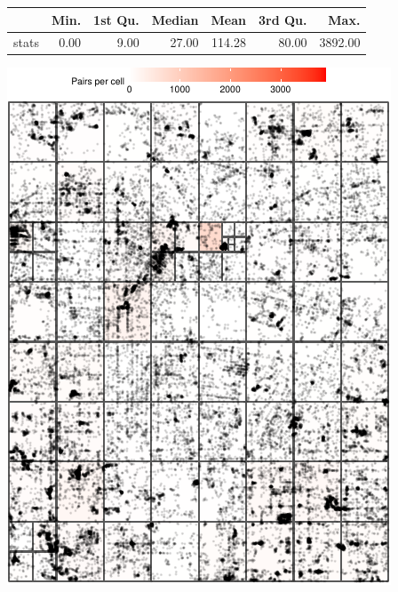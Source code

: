\documentclass[
  9pt,
  landscape]{article}
\begin{document}
\begin{minipage}{0.5\textwidth} 
\centering 
\begin{tabular}{rrrrrrr}
  \hline
 & Min. & 1st Qu. & Median & Mean & 3rd Qu. & Max. \\ 
  \hline
stats & 0.00 & 9.00 & 27.00 & 114.28 & 80.00 & 3892.00 \\ 
   \hline
\end{tabular}
\vspace{0.5cm} 


\includegraphics[width=1\linewidth,height=0.8\textheight]{distance_files/figure-latex/p2_318_1500_4-1} 

\end{minipage}

\pagebreak
\end{document}
